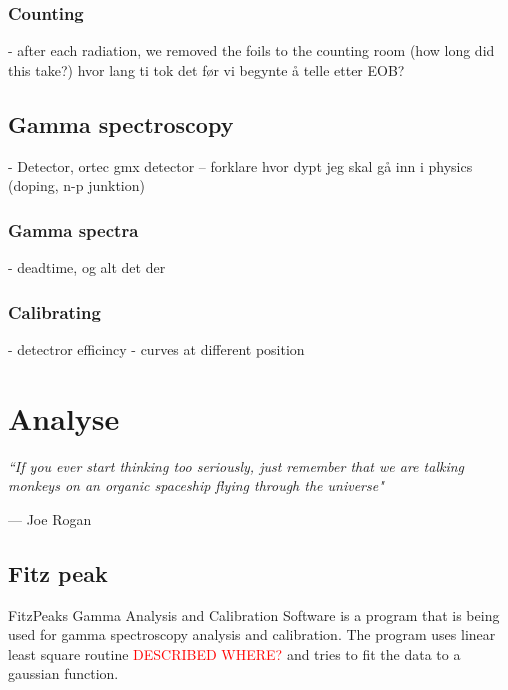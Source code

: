 \documentclass[twoside,english]{uiofysmaster/uiofysmaster}
\begin{document}
\subsection{Counting}
\label{sec:counting}

- after each radiation, we removed the foils to the counting room (how long did this take?) hvor lang ti tok det før vi begynte å telle etter EOB?


\section{Gamma spectroscopy}
\label{sec: gamma_spectro}

- Detector, ortec gmx detector
-- forklare hvor dypt jeg skal gå inn i physics (doping, n-p junktion)


\subsection{Gamma spectra}
\label{sec: gamma_spectra}

- deadtime, og alt det der

\subsection{Calibrating}
\label{sec: calibrating}

- detectror efficincy
- curves at different position


\chapter{Analyse}
\label{ch:analyse}

\epigraph{\itshape ``If you ever start thinking too seriously, just remember that we are talking monkeys on an organic spaceship flying through the universe"}{--- \textup{Joe Rogan}}



\section{Fitz peak}
\label{sec:fitz_peak}

FitzPeaks Gamma Analysis and Calibration Software is a program that  is being used for gamma spectroscopy analysis and calibration. The program uses linear least square routine \textcolor{red}{DESCRIBED WHERE?} and tries to fit the data to a gaussian function. 
\end{document}
